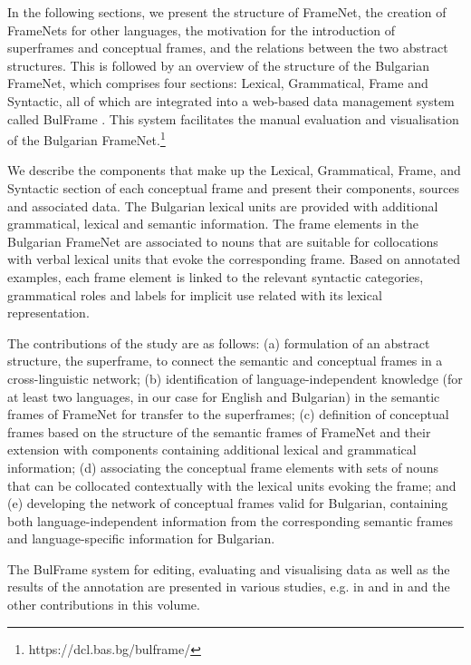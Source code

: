 \documentclass[output=paper,colorlinks,citecolor=brown]{langscibook}
\begin{document}
In the following sections, we present the structure of FrameNet, the creation of FrameNets for other languages, the motivation for the introduction of superframes and conceptual frames, and the relations between the two abstract structures. This is followed by an overview of the structure of the Bulgarian FrameNet, which comprises four sections: Lexical, Grammatical, Frame and Syntactic, all of which are integrated into a web-based data management system called BulFrame \citep{koeva-doychev-2022-ontology}. This system facilitates the manual evaluation and visualisation of the Bulgarian FrameNet.\footnote{https://dcl.bas.bg/bulframe/}

We describe the components that make up the Lexical, Grammatical, Frame, and Syntactic section of each conceptual frame and present their components, sources and associated data. The Bulgarian lexical units are provided with additional grammatical, lexical and semantic information. The frame elements in the Bulgarian FrameNet are associated to nouns that are suitable for collocations with verbal lexical units that evoke the corresponding frame. Based on annotated examples, each frame element is linked to the relevant syntactic categories, grammatical roles and labels for implicit use related with its lexical representation.

The contributions of the study are as follows: (a) formulation of an abstract structure, the superframe, to connect the semantic and conceptual frames in a cross-linguistic network; (b) identification of language-independent knowledge (for at least two languages, in our case for English and Bulgarian) in the semantic frames of FrameNet for transfer to the superframes; (c) definition of conceptual frames based on the structure of the semantic frames of FrameNet and their extension with components containing additional lexical and grammatical information; (d) associating the conceptual frame elements with sets of nouns that can be collocated contextually with the lexical units evoking the frame; and (e) developing the network of conceptual frames valid for Bulgarian, containing both language-independent information from the corresponding semantic frames and language-specific information for Bulgarian.

The BulFrame system for editing, evaluating and visualising data as well as the results of the annotation are presented in various studies, e.g. in \citet{skoeva2024} and in \citet{koeva-doychev-2022-ontology} and the other contributions in this volume.
\end{document}

